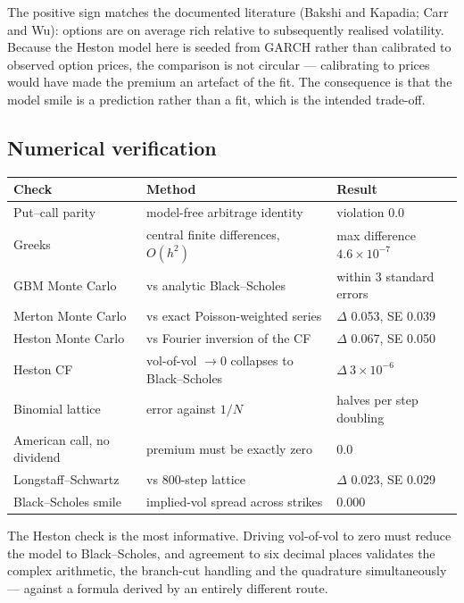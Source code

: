 \documentclass[11pt,a4paper]{article}
\begin{document}
The positive sign matches the documented literature (Bakshi and Kapadia; Carr and Wu):
options are on average rich relative to subsequently realised volatility. Because the
Heston model here is seeded from GARCH rather than calibrated to observed option prices,
the comparison is not circular --- calibrating to prices would have made the premium an
artefact of the fit. The consequence is that the model smile is a prediction rather than a
fit, which is the intended trade-off.

\subsection{Numerical verification}

\begin{center}
\begin{tabular}{p{4.4cm}p{5.6cm}p{4.0cm}}
\toprule
\textbf{Check} & \textbf{Method} & \textbf{Result} \\
\midrule
Put--call parity & model-free arbitrage identity & violation 0.0 \\
Greeks & central finite differences, $O(h^2)$ & max difference $4.6\times10^{-7}$ \\
GBM Monte Carlo & vs analytic Black--Scholes & within 3 standard errors \\
Merton Monte Carlo & vs exact Poisson-weighted series & $\Delta$ 0.053, SE 0.039 \\
Heston Monte Carlo & vs Fourier inversion of the CF & $\Delta$ 0.067, SE 0.050 \\
Heston CF & vol-of-vol $\to 0$ collapses to Black--Scholes & $\Delta\ 3\times10^{-6}$ \\
Binomial lattice & error against $1/N$ & halves per step doubling \\
American call, no dividend & premium must be exactly zero & 0.0 \\
Longstaff--Schwartz & vs 800-step lattice & $\Delta$ 0.023, SE 0.029 \\
Black--Scholes smile & implied-vol spread across strikes & 0.000 \\
\bottomrule
\end{tabular}
\end{center}

The Heston check is the most informative. Driving vol-of-vol to zero must reduce the model
to Black--Scholes, and agreement to six decimal places validates the complex arithmetic,
the branch-cut handling and the quadrature simultaneously --- against a formula derived by
an entirely different route.
\end{document}
